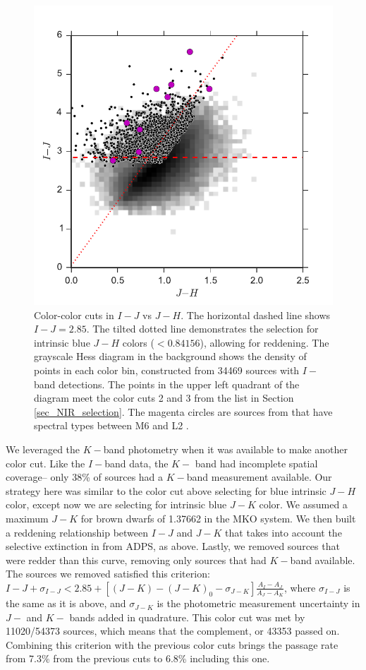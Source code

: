 \begin{figure}[ht!]
  \caption{Color-color cuts in $I-J$ vs $J-H$. The horizontal dashed line shows $I-J=2.85$.  The tilted dotted line demonstrates the selection for intrinsic blue $J-H$ colors ($<0.84156$), allowing for reddening.  The grayscale Hess diagram in the background shows the density of points in each color bin, constructed from 34469 sources with $I-$band detections.  The points in the upper left quadrant of the diagram meet the color cuts 2 and 3 from the list in Section \ref{sec_NIR_selection}.  The magenta circles are sources from \citet{allers06} that have spectral types between M6 and L2 \citep{2011ASPC..448..633G}.\label{fig_NIR_selection_JH}}
\centering
\includegraphics[scale=0.6]{chIMACS/figures/NIR_selection_allers_M6_L2}
\end{figure}

We leveraged the $K-$band photometry when it was available to make another color cut.  Like the $I-$band data, the $K-$ band had incomplete spatial coverage-- only 38\% of sources had a $K-$band measurement available.  Our strategy here was similar to the color cut above selecting for blue intrinsic $J-H$ color, except now we are selecting for intrinsic blue $J-K$ color.  We assumed a maximum $J-K$ for brown dwarfs of 1.37662 in the MKO system.  We then built a reddening relationship between $I-J$ and $J-K$ that takes into account the selective extinction in from ADPS, as above.  Lastly, we removed sources that were redder than this curve, removing only sources that had $K-$band available.  The sources we removed satisfied this criterion:  $I-J + \sigma_{I-J} < 2.85 + [(J-K) - (J-K)_0 - \sigma_{J-K}]\frac{A_I-A_J}{A_J - A_K}$, where $\sigma_{I-J}$ is the same as it is above, and $\sigma_{J-K}$ is the photometric measurement uncertainty in $J-$ and $K-$ bands added in quadrature.  This color cut was met by 11020/54373 sources, which means that the complement, or 43353 passed on.  Combining this criterion with the previous color cuts brings the passage rate from 7.3\% from the previous cuts to 6.8\% including this one.


